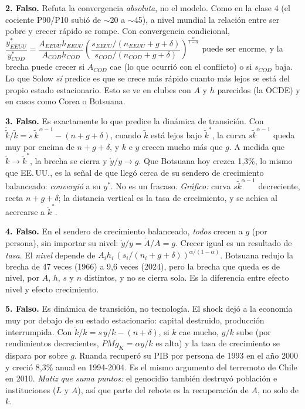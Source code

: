 \documentclass[11pt,letterpaper]{article}
\newcommand{\kt}{\tilde{k}}
\begin{document}
\textbf{2. Falso.} Refuta la convergencia \emph{absoluta}, no el modelo. Como en la clase 4 (el cociente
P90/P10 subió de $\sim$20 a $\sim$45), a nivel mundial la relación entre ser pobre y crecer rápido se rompe. Con
convergencia condicional, $\dfrac{y_{EEUU}^*}{y_{COD}^*} = \dfrac{A_{EEUU}h_{EEUU}}{A_{COD}h_{COD}}
\left(\dfrac{s_{EEUU}/(n_{EEUU}+g+\delta)}{s_{COD}/(n_{COD}+g+\delta)}\right)^{\frac{\alpha}{1-\alpha}}$ puede ser
enorme, y la brecha puede crecer si $A_{COD}$ cae (lo que ocurrió con el conflicto) o si $s_{COD}$ baja. Lo que Solow
\emph{sí} predice es que se crece más rápido cuanto más lejos se está del propio estado estacionario. Esto se ve
en clubes con $A$ y $h$ parecidos (la OCDE) y en casos como Corea o Botsuana.

\textbf{3. Falso.} Es exactamente lo que predice la dinámica de transición. Con $\dot{\kt}/\kt = s\,\kt^{\,\alpha-1}-(n+g+\delta)$,
cuando $\kt$ está lejos bajo $\kt^*$, la curva $s\kt^{\alpha-1}$ queda muy por encima de $n+g+\delta$, y $k$ e $y$ crecen
mucho más que $g$. A medida que $\kt \to \kt^*$, la brecha se cierra y $\dot{y}/y \to g$. Que Botsuana hoy crezca 1,3\%,
lo mismo que EE.\,UU., es la señal de que llegó cerca de su sendero de crecimiento balanceado: \emph{convergió}
a su $y^*$. No es un fracaso. \textit{Gráfico:} curva $s\kt^{\alpha-1}$ decreciente, recta $n+g+\delta$; la distancia
vertical es la tasa de crecimiento, y se achica al acercarse a $\kt^*$.

\textbf{4. Falso.} En el sendero de crecimiento balanceado, \emph{todos} crecen a $g$ (por persona), sin importar su nivel:
$\dot{y}/y = \dot{A}/A = g$. Crecer igual es un resultado de \emph{tasa}. El \emph{nivel} depende de
$A_i h_i\,(s_i/(n_i+g+\delta))^{\alpha/(1-\alpha)}$. Botsuana redujo la brecha de 47 veces (1966) a 9,6 veces (2024),
pero la brecha que queda es de nivel, por $A$, $h$, $s$ y $n$ distintos, y no se cierra sola. Es la diferencia entre
efecto nivel y efecto crecimiento.

\textbf{5. Falso.} Es dinámica de transición, no tecnología. El shock dejó a la economía muy por debajo de su estado
estacionario: capital destruido, producción interrumpida. Con $\dot{k}/k = s\,y/k - (n+\delta)$, si $k$ cae mucho,
$y/k$ sube (por rendimientos decrecientes, $PMg_K = \alpha y/k$ es alta) y la tasa de crecimiento se dispara por sobre $g$.
Ruanda recuperó su PIB por persona de 1993 en el año 2000 y creció 8,3\% anual en 1994-2004. Es el mismo argumento del
terremoto de Chile en 2010. \textit{Matiz que suma puntos:} el genocidio también destruyó población e instituciones
($L$ y $A$), así que parte del rebote es la recuperación de $A$, no solo de $k$.
\end{document}
